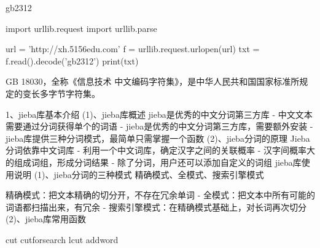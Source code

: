 \documentclass[main.tex]{subfiles}
\begin{document}
gb2312

import urllib.request
import urllib.parse

url = 'http://xh.5156edu.com'
f = urllib.request.urlopen(url)
txt = f.read().decode('gb2312')
print(txt)

GB 18030，全称《信息技术 中文编码字符集》，是中华人民共和国国家标准所规定的变长多字节字符集。

1、jieba库基本介绍
(1)、jieba库概述
jieba是优秀的中文分词第三方库
- 中文文本需要通过分词获得单个的词语
- jieba是优秀的中文分词第三方库，需要额外安装
- jieba库提供三种分词模式，最简单只需掌握一个函数
(2)、jieba分词的原理
Jieba分词依靠中文词库
- 利用一个中文词库，确定汉字之间的关联概率
- 汉字间概率大的组成词组，形成分词结果
- 除了分词，用户还可以添加自定义的词组
jieba库使用说明
(1)、jieba分词的三种模式
精确模式、全模式、搜索引擎模式

精确模式：把文本精确的切分开，不存在冗余单词
- 全模式：把文本中所有可能的词语都扫描出来，有冗余
- 搜索引擎模式：在精确模式基础上，对长词再次切分
(2)、jieba库常用函数

cut
cutforsearch
lcut
addword
\end{document}
